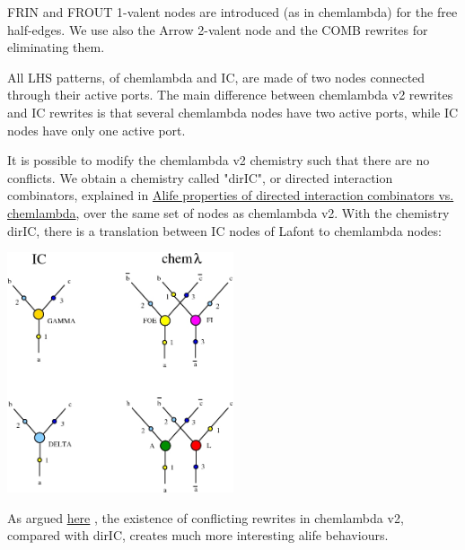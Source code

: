 \documentclass{article}
\begin{document}
FRIN and FROUT 1-valent nodes are introduced (as in chemlambda) for the free half-edges. We use also the Arrow 2-valent node and the COMB rewrites for eliminating them. 



All LHS patterns, of chemlambda and IC, are made of two nodes connected through their active ports. The main difference between chemlambda v2 rewrites and IC rewrites is that several chemlambda nodes have two active ports, while IC nodes have only one active port.


It is possible to modify the chemlambda v2 chemistry such that there are no conflicts. We obtain a chemistry called "dirIC", or directed interaction combinators, explained in \cite{buligaalife} \href{https://mbuliga.github.io/quinegraphs/ic-vs-chem.html#icvschem}{Alife properties of directed interaction combinators vs. chemlambda}, over the same set of nodes as chemlambda v2. With the chemistry dirIC, there is a translation between IC nodes of Lafont to chemlambda nodes: 

\vspace{.5cm}
 
\centerline{\includegraphics[width=0.5\textwidth]{../img/dirIC.jpg}
}
\vspace{.5cm}

As argued \href{https://mbuliga.github.io/quinegraphs/ic-vs-chem.html#icvschem}{here} \cite{buligaalife}, the existence of conflicting rewrites in chemlambda v2, compared with dirIC, creates much more interesting alife behaviours. 
\end{document}
